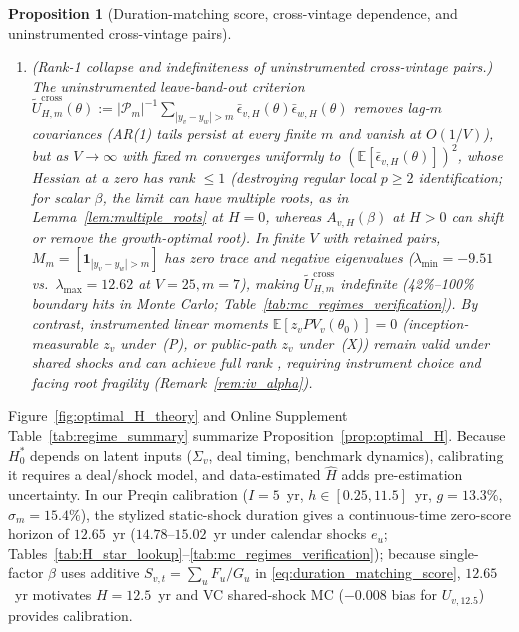 \documentclass[12pt]{article}
\newtheorem{proposition}{Proposition}
\begin{document}
\begin{proposition}[Duration-matching score, cross-vintage dependence, and uninstrumented cross-vintage pairs]
\begin{enumerate}
  \item[\textbf{(iv)}] \emph{(Rank-1 collapse and indefiniteness of uninstrumented cross-vintage pairs.)}
  The \emph{uninstrumented} leave-band-out criterion $\widetilde{U}_{H,m}^{\mathrm{cross}}(\theta) := |\mathcal{P}_m|^{-1}\sum_{|y_v-y_w|>m}\bar\epsilon_{v,H}(\theta)\bar\epsilon_{w,H}(\theta)$ removes lag-$m$ covariances (AR(1) tails persist at every finite $m$ and vanish at $O(1/V)$), but as $V\to\infty$ with fixed $m$ converges uniformly to $(\mathbb{E}[\bar\epsilon_{v,H}(\theta)])^2$, whose Hessian at a zero has rank $\le 1$ (destroying regular local $p \ge 2$ identification; for scalar $\beta$, the limit can have multiple roots, as in Lemma~\ref{lem:multiple_roots} at $H=0$, whereas $A_{v,H}(\beta)$ at $H>0$ can shift or remove the growth-optimal root). In finite $V$ with retained pairs, $M_m = [\mathbf{1}_{|y_v-y_w|>m}]$ has zero trace and negative eigenvalues ($\lambda_{\min}=-9.51$ vs.\ $\lambda_{\max}=12.62$ at $V=25, m=7$), making $\widetilde{U}_{H,m}^{\mathrm{cross}}$ indefinite (42\%--100\% boundary hits in Monte Carlo; Table~\ref{tab:mc_regimes_verification}). By contrast, instrumented linear moments $\mathbb{E}[z_v PV_v(\theta_0)]=0$ (inception-measurable $z_v$ under~(P), or public-path $z_v$ under~(X)) remain valid under shared shocks and can achieve full rank \citep[cf.][]{DL04,MJK20}, requiring instrument choice and facing root fragility (Remark~\ref{rem:iv_alpha}).
\end{enumerate}
\end{proposition}

Figure~\ref{fig:optimal_H_theory} and Online Supplement Table~\ref{tab:regime_summary} summarize Proposition~\ref{prop:optimal_H}.
Because $H_0^\ast$ depends on latent inputs ($\Sigma_v$, deal timing, benchmark dynamics), calibrating it requires a deal/shock model, and data-estimated $\hat H$ adds pre-estimation uncertainty.
In our Preqin calibration ($I=5$~yr, $h \in [0.25,11.5]$~yr, $g=13.3\%$, $\sigma_m=15.4\%$), the stylized static-shock duration gives a continuous-time zero-score horizon of $12.65$~yr ($14.78\text{--}15.02$~yr under calendar shocks $e_u$; Tables~\ref{tab:H_star_lookup}--\ref{tab:mc_regimes_verification}); because single-factor $\beta$ uses additive $S_{v,t} = \sum_u F_u/G_u$ in \eqref{eq:duration_matching_score}, $12.65$~yr motivates $H = 12.5$~yr and VC shared-shock MC ($-0.008$ bias for $U_{v,12.5}$) provides calibration.
\end{document}
